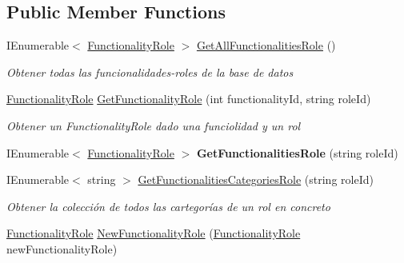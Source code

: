 \subsection*{Public Member Functions}
\begin{DoxyCompactItemize}
\item 
I\+Enumerable$<$ \mbox{\hyperlink{class_h_k_supply_1_1_models_1_1_functionality_role}{Functionality\+Role}} $>$ \mbox{\hyperlink{class_h_k_supply_1_1_services_1_1_implementations_1_1_e_f_functionality_role_a6c0fd4aad39788ef597f701f47032a85}{Get\+All\+Functionalities\+Role}} ()
\begin{DoxyCompactList}\small\item\em Obtener todas las funcionalidades-\/roles de la base de datos \end{DoxyCompactList}\item 
\mbox{\hyperlink{class_h_k_supply_1_1_models_1_1_functionality_role}{Functionality\+Role}} \mbox{\hyperlink{class_h_k_supply_1_1_services_1_1_implementations_1_1_e_f_functionality_role_a1900a194c92ba75d17fe42830190895f}{Get\+Functionality\+Role}} (int functionality\+Id, string role\+Id)
\begin{DoxyCompactList}\small\item\em Obtener un Functionality\+Role dado una funciolidad y un rol \end{DoxyCompactList}\item 
\mbox{\label{class_h_k_supply_1_1_services_1_1_implementations_1_1_e_f_functionality_role_a0cec1ef9a2e1201cfffe604869e5192f}} 
I\+Enumerable$<$ \mbox{\hyperlink{class_h_k_supply_1_1_models_1_1_functionality_role}{Functionality\+Role}} $>$ {\bfseries Get\+Functionalities\+Role} (string role\+Id)
\item 
I\+Enumerable$<$ string $>$ \mbox{\hyperlink{class_h_k_supply_1_1_services_1_1_implementations_1_1_e_f_functionality_role_a1625ffb6313337132a446f831d357453}{Get\+Functionalities\+Categories\+Role}} (string role\+Id)
\begin{DoxyCompactList}\small\item\em Obtener la colección de todos las cartegorías de un rol en concreto \end{DoxyCompactList}\item 
\mbox{\hyperlink{class_h_k_supply_1_1_models_1_1_functionality_role}{Functionality\+Role}} \mbox{\hyperlink{class_h_k_supply_1_1_services_1_1_implementations_1_1_e_f_functionality_role_a07805a2c9809f3771b7ae34deb15b94b}{New\+Functionality\+Role}} (\mbox{\hyperlink{class_h_k_supply_1_1_models_1_1_functionality_role}{Functionality\+Role}} new\+Functionality\+Role)

\end{DoxyCompactItemize}

